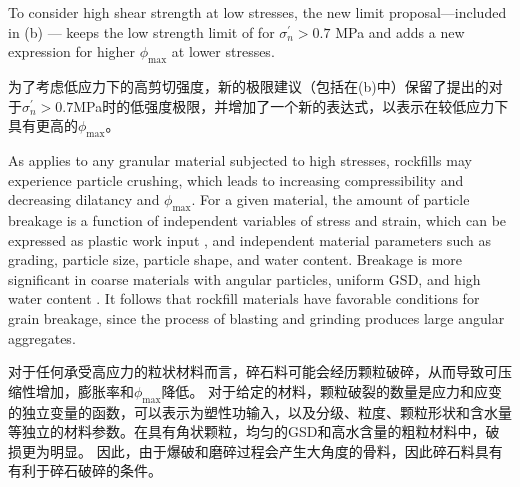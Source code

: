 \begin{ParaColumn}

    \switchcolumn*

    To consider high shear strength at low stresses, the new limit proposal—included in (b) — keeps the low strength limit of \citet{Indraratna1994539} for $\sigma_n^\prime>0.7$ MPa and adds a new expression for higher $\phi_{\max}$ at lower stresses.

    \switchcolumn

    为了考虑低应力下的高剪切强度，新的极限建议（包括在(b)中）保留了\citet{Indraratna1994539}提出的对于$\sigma_n^\prime>0.7$MPa时的低强度极限，并增加了一个新的表达式，以表示在较低应力下具有更高的$\phi_{\max}$。


    As applies to any granular material subjected to high stresses, rockfills may experience particle crushing, which leads to increasing compressibility and decreasing dilatancy and $\phi_{\max}$\citep{Vesic1968661,Biarez19941,Lade1996309,Biarez1997607,Ovalle2015587,Dano201895}. For a given material, the amount of particle breakage is a function of independent variables of stress and strain, which can be expressed as plastic work input \citep{Daouadji2001113,Yin2017,Ovalle2020487}, and independent material parameters such as grading, particle size, particle shape, and water content. Breakage is more significant in coarse materials with angular particles, uniform GSD, and high water content \citep{Hardin19851177,Ovalle2013123,Ovalle2018161}. It follows that rockfill materials have favorable conditions for grain breakage, since the process of blasting and grinding produces large angular aggregates.

    \switchcolumn

    对于任何承受高应力的粒状材料而言，碎石料可能会经历颗粒破碎，从而导致可压缩性增加，膨胀率和$\phi_{\max}$降低\citep{Vesic1968661,Biarez19941,Lade1996309,Biarez1997607,Ovalle2015587,Dano201895}。 对于给定的材料，颗粒破裂的数量是应力和应变的独立变量的函数，可以表示为塑性功输入\citep{Daouadji2001113,Yin2017,Ovalle2020487}，以及分级、粒度、颗粒形状和含水量等独立的材料参数。在具有角状颗粒，均匀的GSD和高水含量的粗粒材料中，破损更为明显\citep{Hardin19851177,Ovalle2013123,Ovalle2018161}。 因此，由于爆破和磨碎过程会产生大角度的骨料，因此碎石料具有有利于碎石破碎的条件。
    

\end{ParaColumn}
